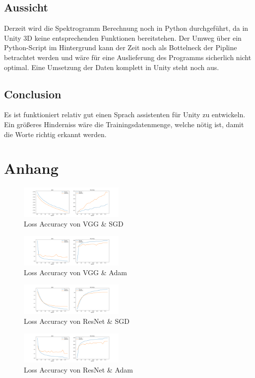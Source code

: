 \documentclass[sigconf]{acmart}
\begin{document}
\subsection{Aussicht}
Derzeit wird die Spektrogramm Berechnung noch in Python durchgeführt, da in Unity 3D keine entsprechenden Funktionen bereitstehen. Der Umweg über ein Python-Script im Hintergrund kann der Zeit noch als Bottelneck der Pipline betrachtet werden und wäre für eine Auslieferung des Programms sicherlich nicht optimal. Eine Umsetzung der Daten komplett in Unity steht noch aus. 

\subsection{Conclusion}
Es ist funktioniert relativ gut einen Sprach assistenten für Unity zu entwickeln. Ein größeres Hinderniss wäre die Trainingsdatenmenge, welche nötig ist, damit die Worte richtig erkannt werden. 

\appendix
\section{Anhang}
\label{section:Anhang}
\begin{figure}[H]
  \includegraphics[width=0.45\textwidth]{images/Loss_Acc_VGG_SGD}
  \caption{Loss Accuracy von VGG \& SGD}
  \Description{}
  \label{fig:VGG_SGD}
\end{figure} 


\begin{figure}[H]
  \includegraphics[width=0.45\textwidth]{images/Loss_Acc_VGG_Adam}
  \caption{Loss Accuracy von VGG \& Adam}
  \Description{}
  \label{fig:VGG_Adam}
\end{figure} 


\begin{figure}[H]
  \includegraphics[width=0.45\textwidth]{images/Loss_Acc_ResNet_SGD}
  \caption{Loss Accuracy von ResNet \& SGD}
  \Description{}
  \label{fig:ResNet_SGD}
\end{figure} 


\begin{figure}[H]
  \includegraphics[width=0.45\textwidth]{images/Loss_Acc_ResNet_Adam}
  \caption{Loss Accuracy von ResNet \& Adam}
  \Description{}
  \label{fig:ResNet_Adam}
\end{figure} 
\end{document}
